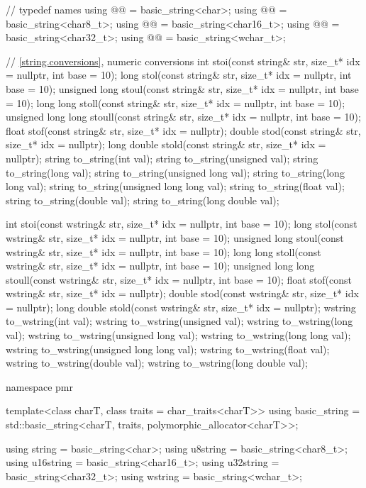 \begin{codeblock}
{  //  typedef names
  using @@    = basic_string<char>;
  using @@  = basic_string<char8_t>;
  using @@ = basic_string<char16_t>;
  using @@ = basic_string<char32_t>;
  using @@   = basic_string<wchar_t>;

  // \ref{string.conversions}, numeric conversions
  int stoi(const string& str, size_t* idx = nullptr, int base = 10);
  long stol(const string& str, size_t* idx = nullptr, int base = 10);
  unsigned long stoul(const string& str, size_t* idx = nullptr, int base = 10);
  long long stoll(const string& str, size_t* idx = nullptr, int base = 10);
  unsigned long long stoull(const string& str, size_t* idx = nullptr, int base = 10);
  float stof(const string& str, size_t* idx = nullptr);
  double stod(const string& str, size_t* idx = nullptr);
  long double stold(const string& str, size_t* idx = nullptr);
  string to_string(int val);
  string to_string(unsigned val);
  string to_string(long val);
  string to_string(unsigned long val);
  string to_string(long long val);
  string to_string(unsigned long long val);
  string to_string(float val);
  string to_string(double val);
  string to_string(long double val);

  int stoi(const wstring& str, size_t* idx = nullptr, int base = 10);
  long stol(const wstring& str, size_t* idx = nullptr, int base = 10);
  unsigned long stoul(const wstring& str, size_t* idx = nullptr, int base = 10);
  long long stoll(const wstring& str, size_t* idx = nullptr, int base = 10);
  unsigned long long stoull(const wstring& str, size_t* idx = nullptr, int base = 10);
  float stof(const wstring& str, size_t* idx = nullptr);
  double stod(const wstring& str, size_t* idx = nullptr);
  long double stold(const wstring& str, size_t* idx = nullptr);
  wstring to_wstring(int val);
  wstring to_wstring(unsigned val);
  wstring to_wstring(long val);
  wstring to_wstring(unsigned long val);
  wstring to_wstring(long long val);
  wstring to_wstring(unsigned long long val);
  wstring to_wstring(float val);
  wstring to_wstring(double val);
  wstring to_wstring(long double val);

  namespace pmr {
    template<class charT, class traits = char_traits<charT>>
      using basic_string = std::basic_string<charT, traits, polymorphic_allocator<charT>>;

    using string    = basic_string<char>;
    using u8string  = basic_string<char8_t>;
    using u16string = basic_string<char16_t>;
    using u32string = basic_string<char32_t>;
    using wstring   = basic_string<wchar_t>;
  }

}
\end{codeblock}
